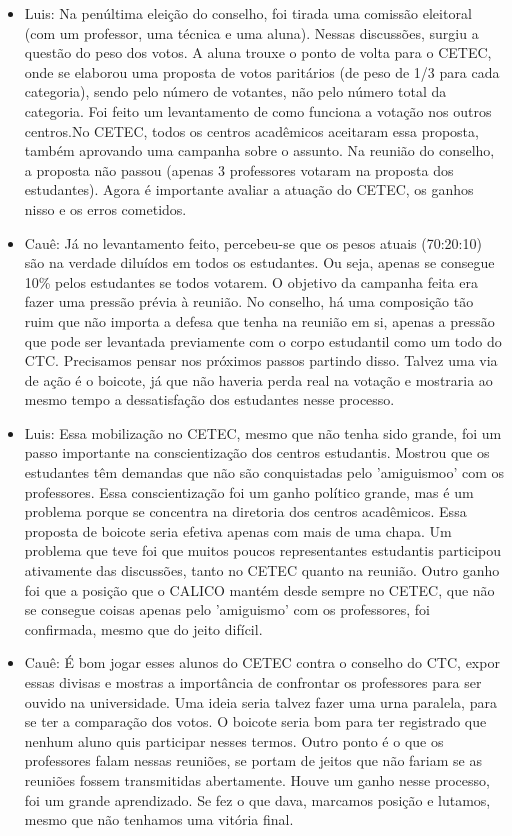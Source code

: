 \documentclass{ata-calico}
\begin{document}
\begin{itemize}
\item Luis: Na penúltima eleição do conselho, foi tirada uma comissão eleitoral (com um professor, uma técnica e uma aluna). Nessas discussões, surgiu a questão do peso dos votos. A aluna trouxe o ponto de volta para o CETEC, onde se elaborou uma proposta de votos paritários (de peso de 1/3 para cada categoria), sendo pelo número de votantes, não pelo número total da categoria. Foi feito um levantamento de como funciona a votação nos outros centros.No CETEC, todos os centros acadêmicos aceitaram essa proposta, também aprovando uma campanha sobre o assunto. Na reunião do conselho, a proposta não passou (apenas 3 professores votaram na proposta dos estudantes). Agora é importante avaliar a atuação do CETEC, os ganhos nisso e os erros cometidos.
\item Cauê: Já no levantamento feito, percebeu-se que os pesos atuais (70:20:10) são na verdade diluídos em todos os estudantes. Ou seja, apenas se consegue 10\% pelos estudantes se todos votarem. O objetivo da campanha feita era fazer uma pressão prévia à reunião. No conselho, há uma composição tão ruim que não importa a defesa que tenha na reunião em si, apenas a pressão que pode ser levantada previamente com o corpo estudantil como um todo do CTC. Precisamos pensar nos próximos passos partindo disso. Talvez uma via de ação é o boicote, já que não haveria perda real na votação e mostraria ao mesmo tempo a dessatisfação dos estudantes nesse processo.
\item Luis: Essa mobilização no CETEC, mesmo que não tenha sido grande, foi um passo importante na conscientização dos centros estudantis. Mostrou que os estudantes têm demandas que não são conquistadas pelo 'amiguismoo' com os professores. Essa conscientização foi um ganho político grande, mas é um problema porque se concentra na diretoria dos centros acadêmicos. Essa proposta de boicote seria efetiva apenas com mais de uma chapa. Um problema que teve foi que muitos poucos representantes estudantis participou ativamente das discussões, tanto no CETEC quanto na reunião. Outro ganho foi que a posição que o CALICO mantém desde sempre no CETEC, que não se consegue coisas apenas pelo 'amiguismo' com os professores, foi confirmada, mesmo que do jeito difícil.
\item Cauê: É bom jogar esses alunos do CETEC contra o conselho do CTC, expor essas divisas e mostras a importância de confrontar os professores para ser ouvido na universidade. Uma ideia seria talvez fazer uma urna paralela, para se ter a comparação dos votos. O boicote seria bom para ter registrado que nenhum aluno quis participar nesses termos. Outro ponto é o que os professores falam nessas reuniões, se portam de jeitos que não fariam se as reuniões fossem transmitidas abertamente. Houve um ganho nesse processo, foi um grande aprendizado. Se fez o que dava, marcamos posição e lutamos, mesmo que não tenhamos uma vitória final.

\end{itemize}
\end{document}
